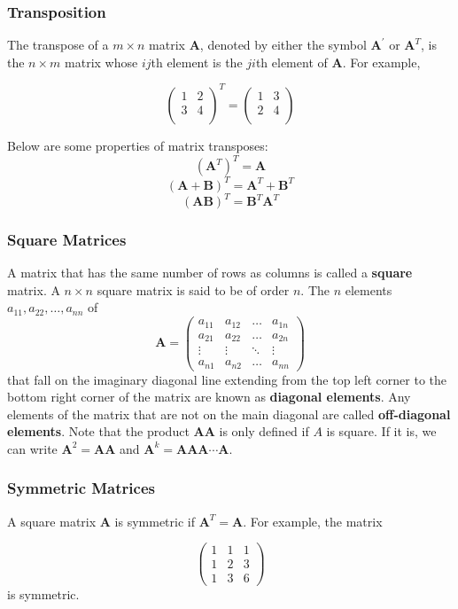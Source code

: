\documentclass{beamer}
\begin{document}
\begin{frame}
\frametitle{Transposition}
The transpose of a $m \times n$ matrix $\mathbf{A}$, denoted by either the symbol $\mathbf{A}^{'}$ or $\mathbf{A}^T$, is the $n \times m$ matrix whose $ij$th element is the $ji$th element of $\mathbf{A}$.  For example,

\[
\begin{pmatrix}
    1 & 2\\
    3 & 4 \\
\end{pmatrix}^T
= 
\begin{pmatrix}
    1 & 3\\
    2 & 4 \\
\end{pmatrix}
\]

Below are some properties of matrix transposes:
\[
(\mathbf{A}^T)^T = \mathbf{A}
\]
\[
(\mathbf{A} + \mathbf{B})^{T} = \mathbf{A}^T + \mathbf{B}^T
\]
\[
(\mathbf{A}\mathbf{B})^{T} = \mathbf{B}^T\mathbf{A}^T
\]

\end{frame}

\begin{frame}
\frametitle{Square Matrices}
A matrix that has the same number of rows as columns is called a \textbf{square} matrix.  A $n \times n$ square matrix is said to be of order $n$.  The $n$ elements $a_{11}, a_{22}, \hdots, a_{nn}$ of
\[\mathbf{A} = 
\begin{pmatrix}
    a_{11} & a_{12} & \dots  & a_{1n} \\
    a_{21} & a_{22}  & \dots  & a_{2n} \\
    \vdots & \vdots  & \ddots & \vdots \\
    a_{n1} & a_{n2}  & \dots  & a_{nn}
\end{pmatrix}
\]
 that fall on the imaginary diagonal line extending from the top left corner to the bottom right corner of the matrix are known as \textbf{diagonal elements}.  Any elements of the matrix that are not on the main diagonal are called \textbf{off-diagonal elements}.  Note that the product $\mathbf{AA}$ is only defined if $A$ is square.  If it is, we can write $\mathbf{A}^2 = \mathbf{AA}$ and $\mathbf{A}^k = \mathbf{AAA\cdots A}$.
\end{frame}

\begin{frame}
\frametitle{Symmetric Matrices}
A square matrix $\mathbf{A}$ is symmetric if $\mathbf{A}^T = \mathbf{A}$.  For example, the matrix

\[\begin{pmatrix}
    1 & 1 & 1\\
    1 & 2 & 3 \\
    1 & 3 & 6   
\end{pmatrix}
\]
is symmetric.
\end{frame}
\end{document}
